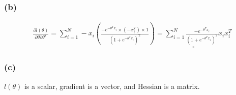 \documentclass{article}
\begin{document}
\subsubsection*{(b)}
	\begin{equation*}
		\begin{aligned}
			\frac{\partial l(\theta)}{\partial \theta \partial \theta^T}  = \sum_{i=1}^{N} -x_i(\frac{-e^{-\theta^Tx_i}\times (-x_i^T)\times 1}{(1+e^{-\theta^Tx_i})^2}) \underline{ \underline{ = \sum_{i=1}^{N}\frac{-e^{-\theta^Tx_i}}{(1+e^{-\theta^Tx_i})^2}x_ix_i^T}}
		\end{aligned}
	\end{equation*}

\subsubsection*{(c)}
	$l(\theta)$ is a scalar, gradient is a vector, and Hessian is a matrix.
	 
\end{document}
